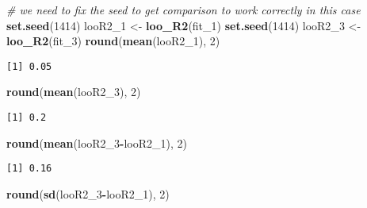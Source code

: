 \documentclass[
]{article}
\newenvironment{Shaded}{\begin{snugshade}}{\end{snugshade}}
\newcommand{\CommentTok}[1]{\textcolor[rgb]{0.56,0.35,0.01}{\textit{#1}}}
\newcommand{\DecValTok}[1]{\textcolor[rgb]{0.00,0.00,0.81}{#1}}
\newcommand{\KeywordTok}[1]{\textcolor[rgb]{0.13,0.29,0.53}{\textbf{#1}}}
\newcommand{\NormalTok}[1]{#1}
\newcommand{\OperatorTok}[1]{\textcolor[rgb]{0.81,0.36,0.00}{\textbf{#1}}}
\newcommand{\StringTok}[1]{\textcolor[rgb]{0.31,0.60,0.02}{#1}}
\begin{document}
\begin{Shaded}
\begin{Highlighting}[]
\CommentTok{# we need to fix the seed to get comparison to work correctly in this case}
\KeywordTok{set.seed}\NormalTok{(}\DecValTok{1414}\NormalTok{)}
\NormalTok{looR2_}\DecValTok{1}\NormalTok{ <-}\StringTok{ }\KeywordTok{loo_R2}\NormalTok{(fit_}\DecValTok{1}\NormalTok{)}
\KeywordTok{set.seed}\NormalTok{(}\DecValTok{1414}\NormalTok{)}
\NormalTok{looR2_}\DecValTok{3}\NormalTok{ <-}\StringTok{ }\KeywordTok{loo_R2}\NormalTok{(fit_}\DecValTok{3}\NormalTok{)}
\KeywordTok{round}\NormalTok{(}\KeywordTok{mean}\NormalTok{(looR2_}\DecValTok{1}\NormalTok{), }\DecValTok{2}\NormalTok{)}
\end{Highlighting}
\end{Shaded}

\begin{verbatim}
[1] 0.05
\end{verbatim}

\begin{Shaded}
\begin{Highlighting}[]
\KeywordTok{round}\NormalTok{(}\KeywordTok{mean}\NormalTok{(looR2_}\DecValTok{3}\NormalTok{), }\DecValTok{2}\NormalTok{)}
\end{Highlighting}
\end{Shaded}

\begin{verbatim}
[1] 0.2
\end{verbatim}

\begin{Shaded}
\begin{Highlighting}[]
\KeywordTok{round}\NormalTok{(}\KeywordTok{mean}\NormalTok{(looR2_}\DecValTok{3}\OperatorTok{-}\NormalTok{looR2_}\DecValTok{1}\NormalTok{), }\DecValTok{2}\NormalTok{)}
\end{Highlighting}
\end{Shaded}

\begin{verbatim}
[1] 0.16
\end{verbatim}

\begin{Shaded}
\begin{Highlighting}[]
\KeywordTok{round}\NormalTok{(}\KeywordTok{sd}\NormalTok{(looR2_}\DecValTok{3}\OperatorTok{-}\NormalTok{looR2_}\DecValTok{1}\NormalTok{), }\DecValTok{2}\NormalTok{)}
\end{Highlighting}
\end{Shaded}
\end{document}
